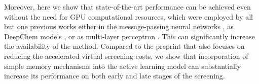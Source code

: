 Moreover, here we show that state-of-the-art performance can be achieved even without the need for GPU computational resources, which were employed by all but one previous works either in the message-passing neural networks \cite{Graff2021AcceleratingLearning}, as DeepChem models \cite{Yang2021_shoichet_active_learning}, or as multi-layer perceptron \cite{deepdocking}. This can significantly increase the availability of the method. Compared to the preprint \cite{logistic_regression} that also focuses on reducing the accelerated virtual screening costs, we show that incorporation of simple memory mechanisms into the active learning model can substantially increase its performance on both early and late stages of the screening.






